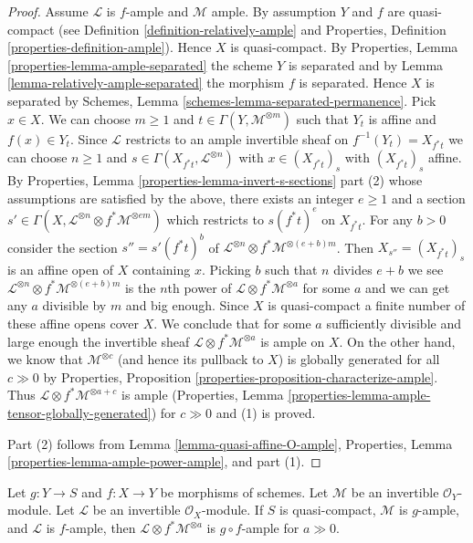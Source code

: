 \begin{proof}
Assume $\mathcal{L}$ is $f$-ample and $\mathcal{M}$ ample.
By assumption $Y$ and $f$ are quasi-compact (see
Definition \ref{definition-relatively-ample} and
Properties, Definition \ref{properties-definition-ample}).
Hence $X$ is quasi-compact. By Properties, Lemma
\ref{properties-lemma-ample-separated} the scheme $Y$ is
separated and by Lemma \ref{lemma-relatively-ample-separated}
the morphism $f$ is separated. Hence $X$ is separated by
Schemes, Lemma \ref{schemes-lemma-separated-permanence}.
Pick $x \in X$. We can choose $m \geq 1$
and $t \in \Gamma(Y, \mathcal{M}^{\otimes m})$ such that $Y_t$
is affine and $f(x) \in Y_t$. Since $\mathcal{L}$ restricts to an
ample invertible sheaf on $f^{-1}(Y_t) = X_{f^*t}$
we can choose $n \geq 1$ and $s \in \Gamma(X_{f^*t}, \mathcal{L}^{\otimes n})$
with $x \in (X_{f^*t})_s$ with $(X_{f^*t})_s$ affine.
By Properties, Lemma \ref{properties-lemma-invert-s-sections} part (2)
whose assumptions are satisfied by the above,
there exists an integer $e \geq 1$ and a section
$s' \in \Gamma(X, \mathcal{L}^{\otimes n} \otimes f^*\mathcal{M}^{\otimes em})$
which restricts to $s(f^*t)^e$ on $X_{f^*t}$. For any $b > 0$
consider the section $s'' = s'(f^*t)^b$ of
$\mathcal{L}^{\otimes n} \otimes f^*\mathcal{M}^{\otimes (e + b)m}$.
Then $X_{s''} = (X_{f^*t})_s$ is an affine open of $X$ containing $x$.
Picking $b$ such that $n$ divides $e + b$ we see
$\mathcal{L}^{\otimes n} \otimes f^*\mathcal{M}^{\otimes (e + b)m}$
is the $n$th power of $\mathcal{L} \otimes f^*\mathcal{M}^{\otimes a}$
for some $a$ and we can get any $a$ divisible by $m$ and big enough.
Since $X$ is quasi-compact a finite number of these affine opens
cover $X$. We conclude that for some $a$ sufficiently divisible and
large enough the invertible sheaf
$\mathcal{L} \otimes f^*\mathcal{M}^{\otimes a}$ is ample on $X$.
On the other hand, we know that $\mathcal{M}^{\otimes c}$
(and hence its pullback to $X$) is globally generated for all $c \gg 0$
by Properties, Proposition \ref{properties-proposition-characterize-ample}.
Thus $\mathcal{L} \otimes f^*\mathcal{M}^{\otimes a + c}$ is ample
(Properties, Lemma \ref{properties-lemma-ample-tensor-globally-generated})
for $c \gg 0$ and (1) is proved.

\medskip\noindent
Part (2) follows from Lemma \ref{lemma-quasi-affine-O-ample},
Properties, Lemma \ref{properties-lemma-ample-power-ample}, and
part (1).
\end{proof}

\begin{lemma}
\label{lemma-ample-composition}
Let $g : Y \to S$ and $f : X \to Y$ be morphisms of schemes.
Let $\mathcal{M}$ be an invertible $\mathcal{O}_Y$-module.
Let $\mathcal{L}$ be an invertible $\mathcal{O}_X$-module.
If $S$ is quasi-compact, $\mathcal{M}$ is $g$-ample, and
$\mathcal{L}$ is $f$-ample, then
$\mathcal{L} \otimes f^*\mathcal{M}^{\otimes a}$
is $g \circ f$-ample for $a \gg 0$.
\end{lemma}

